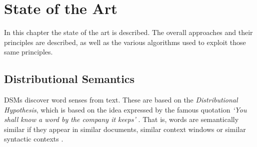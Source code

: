 \chapter{State of the Art}
\label{ch:stateofart}

In this chapter the state of the art is described. The overall approaches and
their principles are described, as well as the various algorithms used to
exploit those same principles.

\section{Distributional Semantics}

\acp{DSM} discover word senses from text. These are based on the 
\textit{Distributional Hypothesis}, which is based on the idea expressed by the 
famous quotation \textit{`You shall know a 
word by the company it keeps'} \citep{firth1957papers}. That is, words are 
semantically similar if they appear in similar documents, similar context 
windows or similar syntactic contexts \citep{van2010mining}.







